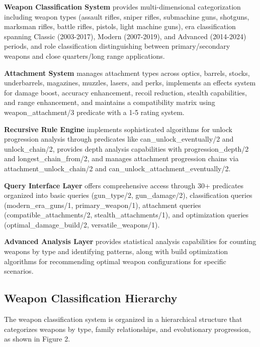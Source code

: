 \documentclass[12pt,a4paper]{article}
\begin{document}
\textbf{Weapon Classification System} provides multi-dimensional categorization including weapon types (assault rifles, sniper rifles, submachine guns, shotguns, marksman rifles, battle rifles, pistols, light machine guns), era classification spanning Classic (2003-2017), Modern (2007-2019), and Advanced (2014-2024) periods, and role classification distinguishing between primary/secondary weapons and close quarters/long range applications.

\textbf{Attachment System} manages attachment types across optics, barrels, stocks, underbarrels, magazines, muzzles, lasers, and perks, implements an effects system for damage boost, accuracy enhancement, recoil reduction, stealth capabilities, and range enhancement, and maintains a compatibility matrix using weapon\_attachment/3 predicate with a 1-5 rating system.

\textbf{Recursive Rule Engine} implements sophisticated algorithms for unlock progression analysis through predicates like can\_unlock\_eventually/2 and unlock\_chain/2, provides depth analysis capabilities with progression\_depth/2 and longest\_chain\_from/2, and manages attachment progression chains via attachment\_unlock\_chain/2 and can\_unlock\_attachment\_eventually/2.

\textbf{Query Interface Layer} offers comprehensive access through 30+ predicates organized into basic queries (gun\_type/2, gun\_damage/2), classification queries (modern\_era\_guns/1, primary\_weapon/1), attachment queries (compatible\_attachments/2, stealth\_attachments/1), and optimization queries (optimal\_damage\_build/2, versatile\_weapons/1).

\textbf{Advanced Analysis Layer} provides statistical analysis capabilities for counting weapons by type and identifying patterns, along with build optimization algorithms for recommending optimal weapon configurations for specific scenarios.

\subsection{Weapon Classification Hierarchy}

The weapon classification system is organized in a hierarchical structure that
categorizes weapons by type, family relationships, and evolutionary
progression, as shown in Figure 2.
\end{document}
